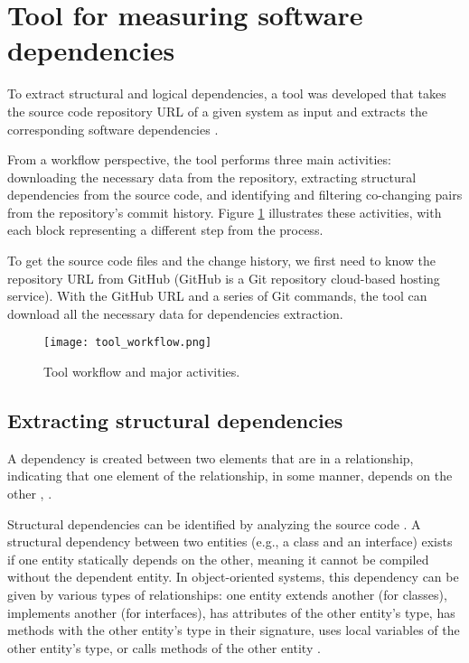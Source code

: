 \section{Tool for measuring software dependencies}
\label{subsec:tool_measuring_dependencies}

\hspace{4em}To extract structural and logical dependencies, a tool was developed that takes the source code repository URL of a given system as input and extracts the corresponding software dependencies \cite{DepSACI, enase19}.

From a workflow perspective, the tool performs three main activities: downloading the necessary data from the repository, extracting structural dependencies from the source code, and identifying and filtering co-changing pairs from the repository's commit history. Figure \ref{fig:figworkflow} illustrates these activities, with each block representing a different step from the process.


To get the source code files and the change history, we first need to know the repository URL from GitHub (GitHub is a Git repository cloud-based hosting service). With the GitHub URL and a series of Git commands, the tool can download all the necessary data for dependencies extraction.

\begin{figure}[H]
\centering
\texttt{[image: tool\_workflow.png]}
\caption{Tool workflow and major activities.}
\label{fig:figworkflow}
\end{figure}



\subsection{Extracting structural dependencies}
\label{subsec:extracting_structural_dependencies}

\hspace{4em}A dependency is created between two elements that are in a relationship, indicating that one element of the relationship, in some manner, depends on the other \cite{Booch:2004:OAD:975416}, \cite{Cataldo2009SoftwareDW}.

Structural dependencies can be identified by analyzing the source code \cite{structdep}. A structural dependency between two entities (e.g., a class and an interface) exists if one entity statically depends on the other, meaning it cannot be compiled without the dependent entity. In object-oriented systems, this dependency can be given by various types of relationships: one entity extends another (for classes), implements another (for interfaces), has attributes of the other entity's type, has methods with the other entity's type in their signature, uses local variables of the other entity's type, or calls methods of the other entity \cite{Sangal:2005:UDM:1094811.1094824, CalloArias2011, 1199197}.

